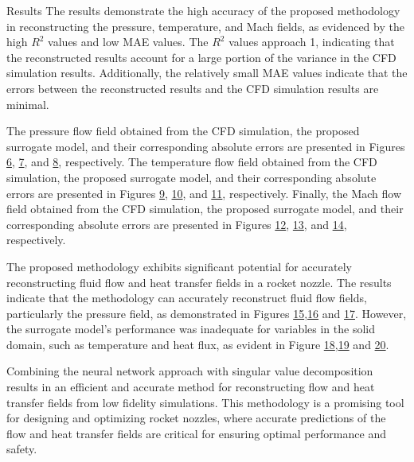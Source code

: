 \begin{frame}{Results}
The results demonstrate the high accuracy of the proposed methodology in
reconstructing the pressure, temperature, and Mach fields, as evidenced
by the high \(R^2\) values and low MAE values. The \(R^2\) values
approach 1, indicating that the reconstructed results account for a
large portion of the variance in the CFD simulation results.
Additionally, the relatively small MAE values indicate that the errors
between the reconstructed results and the CFD simulation results are
minimal.

The pressure flow field obtained from the CFD simulation, the proposed
surrogate model, and their corresponding absolute errors are presented
in Figures \protect\hyperlink{fig:cfd_pressure}{6},
\protect\hyperlink{fig:prediction_pressure}{7}, and
\protect\hyperlink{fig:error_pressure}{8}, respectively. The temperature
flow field obtained from the CFD simulation, the proposed surrogate
model, and their corresponding absolute errors are presented in Figures
\protect\hyperlink{fig:cfd_temperature}{9},
\protect\hyperlink{fig:prediction_temperature}{10}, and
\protect\hyperlink{fig:error_temperature}{11}, respectively. Finally,
the Mach flow field obtained from the CFD simulation, the proposed
surrogate model, and their corresponding absolute errors are presented
in Figures \protect\hyperlink{fig:cfd_mach}{12},
\protect\hyperlink{fig:prediction_mach}{13}, and
\protect\hyperlink{fig:error_mach}{14}, respectively.

The proposed methodology exhibits significant potential for accurately
reconstructing fluid flow and heat transfer fields in a rocket nozzle.
The results indicate that the methodology can accurately reconstruct
fluid flow fields, particularly the pressure field, as demonstrated in
Figures
\protect\hyperlink{fig:r2_pressure}{15},\protect\hyperlink{fig:r2_temperature}{16}
and \protect\hyperlink{fig:r2_mach}{17}. However, the surrogate model's
performance was inadequate for variables in the solid domain, such as
temperature and heat flux, as evident in Figure
\protect\hyperlink{fig:r2_heat_flux}{18},\protect\hyperlink{fig:r2_temperature_solid_wall}{19}
and \protect\hyperlink{fig:r2_temperature_solid}{20}.

Combining the neural network approach with singular value decomposition
results in an efficient and accurate method for reconstructing flow and
heat transfer fields from low fidelity simulations. This methodology is
a promising tool for designing and optimizing rocket nozzles, where
accurate predictions of the flow and heat transfer fields are critical
for ensuring optimal performance and safety.


\end{frame}
